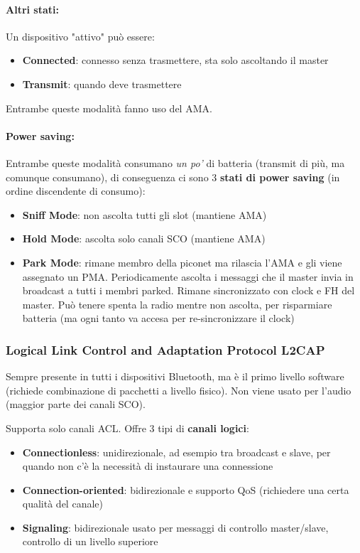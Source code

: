 \paragraph{Altri stati:} Un dispositivo "attivo" può essere:
\begin{itemize}
	\item \textbf{Connected}: connesso senza trasmettere, sta solo ascoltando il master

	\item \textbf{Transmit}: quando deve trasmettere
\end{itemize}
Entrambe queste modalità fanno uso del AMA.

\paragraph{Power saving:} Entrambe queste modalità consumano \textit{un po'} di batteria (transmit di più, ma comunque consumano), di conseguenza ci sono 3 \textbf{stati di power saving} (in ordine discendente di consumo): 
\begin{itemize}
    \item \textbf{Sniff Mode}: non ascolta tutti gli slot (mantiene AMA)
    
    \item \textbf{Hold Mode}: ascolta solo canali SCO (mantiene AMA)
    
    \item \textbf{Park Mode}: rimane membro della piconet ma rilascia l'AMA e gli viene assegnato un PMA. Periodicamente ascolta i messaggi che il master invia in broadcast a tutti i membri parked. Rimane sincronizzato con clock e FH del master. Può tenere spenta la radio mentre non ascolta, per risparmiare batteria (ma ogni tanto va accesa per re-sincronizzare il clock)
\end{itemize}

\subsubsection{Logical Link Control and Adaptation Protocol L2CAP}

Sempre presente in tutti i dispositivi Bluetooth, ma è il primo livello software (richiede combinazione di pacchetti a livello fisico). Non viene usato per l'audio (maggior parte dei canali SCO).

Supporta solo canali ACL. Offre 3 tipi di \textbf{canali logici}:
\begin{itemize}
	\item \textbf{Connectionless}: unidirezionale, ad esempio tra broadcast e slave, per quando non c'è la necessità di instaurare una connessione
	
    \item \textbf{Connection-oriented}: bidirezionale e supporto QoS (richiedere una certa qualità del canale)
	
    \item \textbf{Signaling}: bidirezionale usato per messaggi di controllo master/slave, controllo di un livello superiore
\end{itemize}

